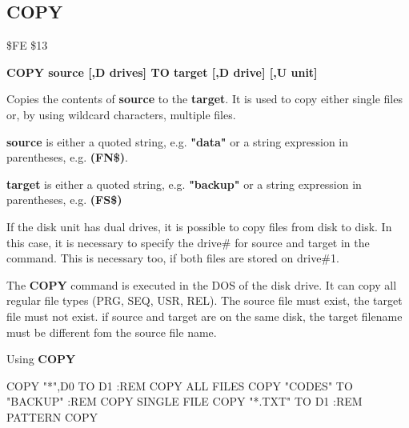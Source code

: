 \subsection{COPY}
\begin{description}[leftmargin=3cm,style=nextline]
\item [Token:] \$FE \$13
\item [Format:] {\bf COPY source [,D drives] TO
                target [,D drive] [,U unit] }
\item [Usage:]
   Copies the contents of
   {\bf source} to the {\bf target}.
   It is used to copy either single files or, by using
   wildcard characters, multiple files.

   {\bf source} is either a quoted string, e.g. {\bf "data"} or
   a string expression in parentheses, e.g. {\bf (FN\$)}.

   {\bf target} is either a quoted string, e.g. {\bf "backup"} or
   a string expression in parentheses, e.g. {\bf (FS\$)}

   If the disk unit has dual drives, it is possible to copy
   files from disk to disk.
   In this case, it is necessary to specify the drive\#
   for source and target in the command. This is necessary too, if both
   files are stored on drive\#1.

   \drivedefinition

   \unitdefinition

\item [Remarks:]
   The {\bf COPY} command is executed in the DOS of the disk drive.
   It can copy all regular file types (PRG, SEQ, USR, REL).
   The source file must exist, the target file must not exist.
   if source and target are on the same disk, the target filename
   must be different fom the source file name.

\item [Example:] Using {\bf COPY}
\begin{screenoutput}
  COPY "*",D0 TO D1        :REM COPY ALL FILES
  COPY "CODES" TO "BACKUP" :REM COPY SINGLE FILE
  COPY "*.TXT" TO D1       :REM PATTERN COPY
\end{screenoutput}
\end{description}


\newpage
